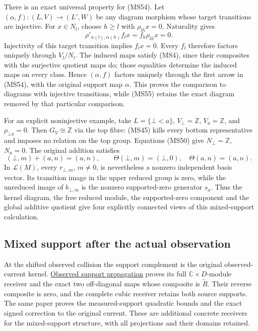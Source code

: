 \documentclass[
]{article}
\begin{document}
There is an exact universal property for (MS54). Let
\((\alpha,f):(L,V)\to(L',W)\) be any diagram morphism whose target
transitions are injective. For \(x\in N_l\), choose \(h\ge l\) with
\(\rho_{lh}x=0\). Naturality gives \[
\rho'_{\alpha(l),\alpha(h)}f_lx=f_h\rho_{lh}x=0.
\tag{MS56}
\] Injectivity of this target transition implies \(f_lx=0\). Every
\(f_l\) therefore factors uniquely through \(V_l/N_l\). The induced maps
satisfy (MS4), since their composites with the surjective quotient maps
do; those equalities determine the induced maps on every class. Hence
\((\alpha,f)\) factors uniquely through the first arrow in (MS54), with
the original support map \(\alpha\). This proves the comparison to
diagrams with injective transitions, while (MS55) retains the exact
diagram removed by that particular comparison.

For an explicit noninjective example, take \(L=\{\bot<a\}\),
\(V_\bot=\mathbb Z\), \(V_a=\mathbb Z\), and \(\rho_{\bot a}=0\). Then
\(G_V\cong\mathbb Z\) via the top fibre: (MS45) kills every bottom
representative and imposes no relation on the top group. Equations
(MS50) give \(N_\bot=\mathbb Z\), \(N_a=0\). The original addition
satisfies \[
(\bot,m)+(a,n)=(a,n),
\qquad
\Theta(\bot,m)=(\bot,0),\quad
\Theta(a,n)=(a,n).
\tag{MS57}
\] In \(\mathscr L(M)\), every \(r_{\bot,m}\), \(m\ne0\), is
nevertheless a nonzero independent basis vector. Its transition image in
the upper reduced group is zero, while the unreduced image of
\(b_{\bot,m}\) is the nonzero supported-zero generator \(s_a\). Thus the
kernel diagram, the free reduced module, the supported-zero component
and the global additive quotient give four explicitly connected views of
this mixed-support calculation.

\subsection{Mixed support after the actual
observation}\label{mixed-support-after-the-actual-observation}

At the shifted observed collision the support complement is the original
observed-current kernel.
\href{https://github.com/KokunoYumeto/zeta-function-research-reader/blob/c9df443d9e1df000dfbb083943f97197e746eb08/workbenches/splitzero-tandem/branches/identity-absorber-square/OBSERVED_SUPPORT_PROPAGATION.md}{Observed
support propagation} proves its full \(\mathbb C\times D\)-module
receiver and the exact two off-diagonal maps whose composite is
\(\widetilde R\). Their reverse composite is zero, and the complete
cubic receiver retains both source supports. The same paper proves the
measured-support quadratic bounds and the exact signed correction to the
original current. These are additional concrete receivers for the
mixed-support structure, with all projections and their domains
retained.
\end{document}
